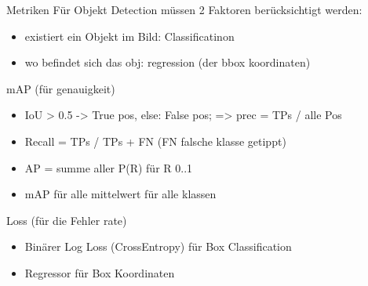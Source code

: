 \begin{frame}{Metriken}
    Für Objekt Detection müssen 2 Faktoren berücksichtigt werden:
    \begin{itemize}
        \item existiert ein Objekt im Bild: Classificatinon
        \item wo befindet sich das obj: regression (der bbox koordinaten)
    \end{itemize}
    \begin{block}{mAP (für genauigkeit)}
        \begin{itemize}
            \item IoU > 0.5 -> True pos, else: False pos; => prec = TPs / alle Pos
            \item Recall = TPs / TPs + FN (FN falsche klasse getippt)
            \item AP = summe aller P(R) für R 0..1
            \item mAP für alle mittelwert für alle klassen
        \end{itemize}        
    \end{block}
    \begin{block}{Loss (für die Fehler rate)}
        \begin{itemize}
            \item Binärer Log Loss (CrossEntropy) für Box Classification
            \item Regressor für Box Koordinaten
        \end{itemize}
    \end{block}
\end{frame}

